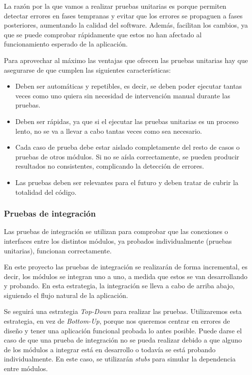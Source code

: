 La razón por la que vamos a realizar pruebas unitarias es porque permiten detectar errores en fases tempranas y evitar que los errores se propaguen a fases posteriores, aumentando la calidad del software. Además, facilitan los cambios, ya que se puede comprobar rápidamente que estos no han afectado al funcionamiento esperado de la aplicación.

Para aprovechar al máximo las ventajas que ofrecen las pruebas unitarias hay que asegurarse de que cumplen las siguientes características:
\begin{itemize}
    \item Deben ser automáticas y repetibles, es decir, se deben poder ejecutar tantas veces como uno quiera sin necesidad de intervención manual durante las pruebas.
    \item Deben ser rápidas, ya que si el ejecutar las pruebas unitarias es un proceso lento, no se va a llevar a cabo tantas veces como sea necesario.
    \item Cada caso de prueba debe estar aislado completamente del resto de casos o pruebas de otros módulos. Si no se aísla correctamente, se pueden producir resultados no consistentes, complicando la detección de errores.
    \item Las pruebas deben ser relevantes para el futuro y deben tratar de cubrir la totalidad del código.
\end{itemize}
\subsubsection{Pruebas de integración}
Las pruebas de integración se utilizan para comprobar que las conexiones o interfaces entre los distintos módulos, ya probados individualmente (pruebas unitarias), funcionan correctamente.

En este proyecto las pruebas de integración se realizarán de forma incremental, es decir, los módulos se integran uno a uno, a medida que estos se van desarrollando y probando. En esta estrategia, la integración se lleva a cabo de arriba abajo, siguiendo el flujo natural de la aplicación.

Se seguirá una estrategia \textit{Top-Down} para realizar las pruebas. Utilizaremos esta estrategia, en vez de \textit{Bottom-Up}, porque nos queremos centrar en errores de diseño y tener una aplicación funcional probada lo antes posible.
Puede darse el caso de que una prueba de integración no se pueda realizar debido a que alguno de los módulos a integrar está en desarrollo o todavía se está probando individualmente. En este caso, se utilizarán \textit{stubs} para simular la dependencia entre módulos.

